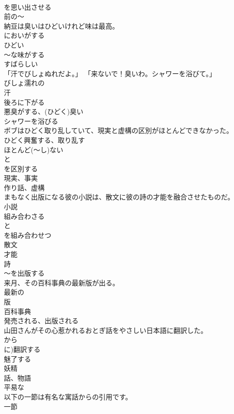 \documentclass[8pt]{extreport}
\begin{document}
\begin{CJK}{UTF8}{min}
\\	を思い出させる 
\\	前の～
\\	納豆は臭いはひどいけれど味は最高。	
\\	においがする 
\\	ひどい 
\\	～な味がする 
\\	すばらしい
\\	「汗でびしょぬれだよ。」 「来ないで！臭いわ。シャワーを浴びて。」	
\\	びしょ濡れの 
\\	汗 
\\	後ろに下がる 
\\	悪臭がする、(ひどく)臭い 
\\	シャワーを浴びる
\\	ボブはひどく取り乱していて、現実と虚構の区別がほとんどできなかった。	
\\	ひどく興奮する、取り乱す 
\\	ほとんど(～し)ない 
\\	と
\\	を区別する 
\\	現実、事実 
\\	作り話、虚構
\\	まもなく出版になる彼の小説は、散文に彼の詩の才能を融合させたものだ。	
\\	小説 
\\	組み合わさる 
\\	と
\\	を組み合わせつ 
\\	散文 
\\	才能 
\\	詩 
\\	～を出版する
\\	来月、その百科事典の最新版が出る。	
\\	最新の 
\\	版 
\\	百科事典 
\\	発売される、出版される
\\	山田さんがその心惹かれるおとぎ話をやさしい日本語に翻訳した。	
\\	から
\\	に)翻訳する 
\\	魅了する 
\\	妖精 
\\	話、物語 
\\	平易な
\\	以下の一節は有名な寓話からの引用です。	
\\	一節 

\end{CJK}
\end{document}
